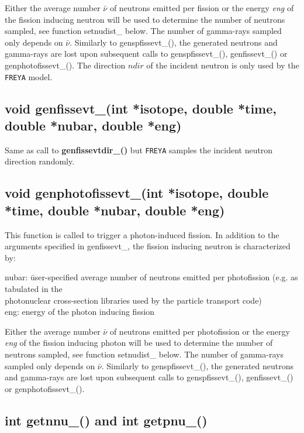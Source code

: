 Either the average number $\bar{\nu}$ of neutrons emitted per fission or the energy \textit{eng} of the fission inducing 
neutron will be used to determine the number of neutrons sampled, see function setnudist\_ below. The number 
of gamma-rays sampled only depends on $\bar{\nu}$. Similarly to genspfissevt\_(), the generated neutrons and gamma-rays are lost upon subsequent calls to genspfissevt\_(), genfissevt\_() or genphotofissevt\_(). The direction $ndir$ of the incident neutron is only used by the {\tt FREYA} model.

\subsection*{void genfissevt\_(int *isotope, double *time, double *nubar, double *eng)}
Same as call to {\bf genfissevtdir\_()} but {\tt FREYA} samples the incident neutron direction randomly.

\subsection*{void genphotofissevt\_(int *isotope, double *time, double *nubar, double *eng)}
This function is called to trigger a photon-induced fission. In addition to the arguments specified in genfissevt\_, the 
fission inducing neutron is characterized by:

\begin{tabbing}
\indent nubar: \= user-specified average number of neutrons emitted per photofission (e.g. as tabulated in the \\ 
\> photonuclear cross-section libraries used by the particle transport code) \\
\indent eng: \> energy of the photon inducing fission \\
\end{tabbing}

Either the average number $\bar{\nu}$ of neutrons emitted per photofission or the energy \textit{eng} of the fission inducing 
photon will be used to determine the number of neutrons sampled, see function setnudist\_ below. The number of gamma-rays sampled only depends on $\bar{\nu}$. Similarly to genspfissevt\_(), the generated neutrons and gamma-rays are lost upon subsequent calls to genspfissevt\_(), genfissevt\_() or genphotofissevt\_().

\subsection*{int getnnu\_() and int getpnu\_()}

